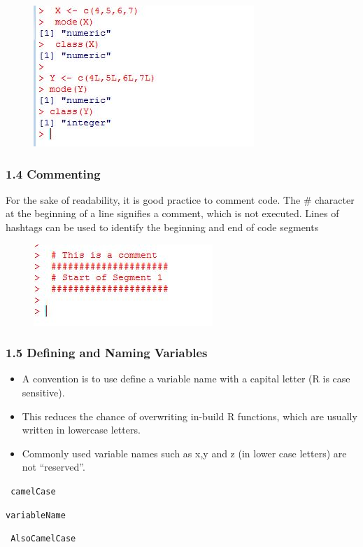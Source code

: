 \documentclass{beamer}
\begin{document}
 \begin{frame}
 	\begin{figure}
 		\centering
 		\includegraphics[width=0.7\linewidth]{images/numerictypes}    
 	\end{figure}
 \end{frame}   
 \begin{frame}
 	\frametitle{1.4 Commenting}
 	For the sake of readability, it is good practice to comment code. The \# character at the
 	beginning of a line signifies a comment, which is not executed. Lines of hashtags can be used
 	to identify the beginning and end of code segments
 	\begin{figure}
 		\centering
 		\includegraphics[width=0.7\linewidth]{images/commenting}
 		\caption{}
 		\label{fig:commenting}
 	\end{figure}
 	
 \end{frame}
 \begin{frame}
 	\frametitle{1.5 Defining and Naming Variables}
 	\begin{itemize}
 		\item A convention is to use define a variable name with a capital letter (R is case sensitive). 
 		\item This
 		reduces the chance of overwriting in-build R functions, which are usually written in lowercase
 		letters. 
 		\item Commonly used variable names such as x,y and z (in lower case letters) are not “reserved”.
 	\end{itemize}
 	
 	\begin{framed}
 		\texttt{	camelCase}
 		
 		\texttt{variableName}
 		
 		\texttt{	AlsoCamelCase}
 	\end{framed}
 \end{frame}
\end{document}
